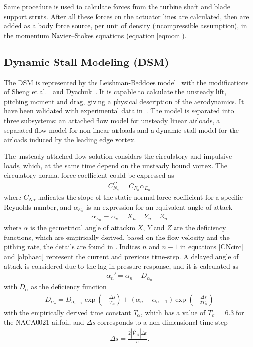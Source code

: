 \documentclass[a4paper]{jpconf}
\begin{document}
Same procedure is used to calculate forces from the turbine shaft and blade
support struts. After all these forces on the actuator lines are calculated,
then are added as a body force source, per unit of density (incompressible
assumption), in the momentum Navier--Stokes equations (equation \ref{eqmom}).

\subsection{Dynamic Stall Modeling (DSM)} The DSM is represented by the
Leishman-Beddoes model~\cite{leishman1986generalised} with the modifications of
Sheng et al.~\cite{sheng2008modified} and Dyachuk~\cite{dyachuk}. It is capable to
calculate the unsteady lift, pitching moment and drag, giving a physical
description of the aerodynamics. It have been validated with experimental data
in~\cite{leishman1989semi}. The model is separated into three subsystems: an
attached flow model for unsteady linear airloads, a separated flow model for
non-linear airloads and a dynamic stall model for the airloads induced by the
leading edge vortex.

The unsteady attached flow solution considers the circulatory and impulsive loads, which, at the same time depend on the unsteady bound vortex. The circulatory normal force coefficient could be expressed as
\begin{align}
& C_{N_n}^C = C_{N_\alpha} \alpha_{E_n}	\label{CNcirc}
\end{align}
where $C_{N \alpha}$ indicates the slope of the static normal force coefficient for a specific Reynolds number, and $\alpha_{E_n}$ is an expression for an equivalent angle of attack
\begin{align}
& \alpha_{E_n} = \alpha_n - X_n -Y_n - Z_n	\label{alphaeq}
\end{align}
where $\alpha$ is the geometrical angle of attackm $X$, $Y$ and $Z$ are the deficiency functions, which are empirically derived, based on the flow velocity and the pithing rate, the details are found in \cite{dyachuk2013dynamic}. Indices $n$ and $n-1$ in equations \ref{CNcirc} and \ref{alphaeq} represent the current and previous time-step. A delayed angle of attack is considered due to the lag in pressure response, and it is calculated as
\begin{align}
& {\alpha _n}' = {\alpha _n} - D_{\alpha _n}    	\label{alphadel}
\end{align}
with $D_\alpha$ as the deficiency function
\begin{align}
& D_{\alpha_n} = D_{\alpha_{n-1}} \exp \left( - \frac{\Delta s}{T_\alpha} \right) + (\alpha_n - \alpha_{n-1})\exp \left( - \frac{\Delta s}{2T_\alpha} \right) \label{defalpha}
\end{align}
with the empirically derived time constant $T_\alpha$, which has a value of $T_\alpha$ = 6.3 for the NACA0021 airfoil, and $\Delta s$ corresponds to a non-dimensional time-step
\begin{align}
& \Delta s = \frac{2 | \vec{V}_{rel} | \Delta t}{c}		.	\label{deltas}
\end{align}
\end{document}
